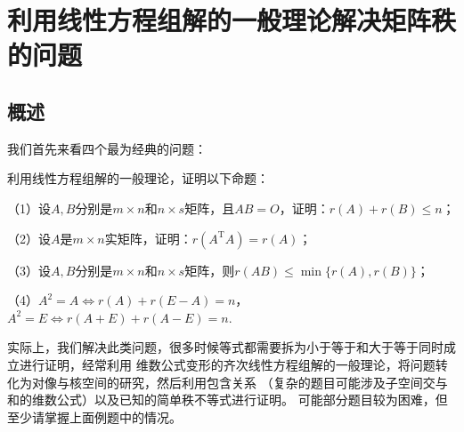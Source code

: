 \section{利用线性方程组解的一般理论解决矩阵秩的问题}
\subsection{概述}
我们首先来看四个最为经典的问题：
\begin{example}
	利用线性方程组解的一般理论，证明以下命题：
	
	\textup{（1）}设$A,B$分别是$m \times n$和$n \times s$矩阵，且$AB=O$，证明：$r(A)+r(B)\le n$\textup{；}

	\textup{（2）}设$A$是$m \times n$实矩阵，证明：$r(A^\mathrm{T}A)=r(A)$\textup{；}

	\textup{（3）}设$A,B$分别是$m \times n$和$n \times s$矩阵，则$r(AB)\le\min\{r(A),r(B)\}$\textup{；}

	\textup{（4）}$A^2=A \iff r(A)+r(E-A)=n$，$A^2=E \iff r(A+E)+r(A-E)=n$.
\end{example}
实际上，我们解决此类问题，很多时候等式都需要拆为小于等于和大于等于同时成立进行证明，经常利用
维数公式变形的齐次线性方程组解的一般理论，将问题转化为对像与核空间的研究，然后利用包含关系
（复杂的题目可能涉及子空间交与和的维数公式）以及已知的简单秩不等式进行证明。
可能部分题目较为困难，但至少请掌握上面例题中的情况。
